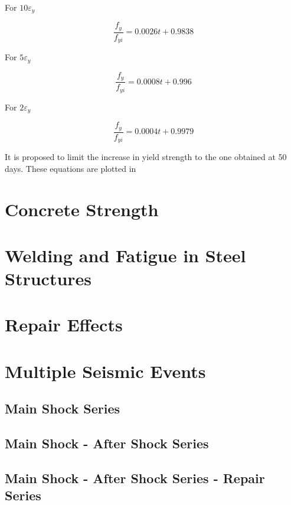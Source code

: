For $10\varepsilon_y$

\begin{equation}
  \frac{f_y}{f_{yi}}=0.0026t+0.9838
  \label{eq.nine}
\end{equation} 

For $5\varepsilon_y$

\begin{equation}
  \frac{f_y}{f_{yi}}=0.0008t+0.996
  \label{eq.ten}
\end{equation} 

For $2\varepsilon_y$

\begin{equation}
  \frac{f_y}{f_{yi}}=0.0004t+0.9979
  \label{eq.eleven}
\end{equation} 

It is proposed to limit the increase in yield strength to the one obtained at 50 days. These equations are plotted in 

\section{Concrete Strength}

\section{Welding and Fatigue in Steel Structures}

\section{Repair Effects}

\section{Multiple Seismic Events}

\subsection{Main Shock Series}

\subsection{Main Shock - After Shock Series}

\subsection{Main Shock - After Shock Series - Repair Series}
